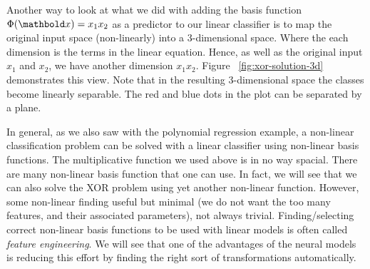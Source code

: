 Another way to look at what we did with adding the basis function
$\Phi(\vect{x}) = x_{1}x_{2}$ as a predictor to our linear classifier
is to map the original input space (non-linearly)
into a 3-dimensional space.
Where the each dimension is the terms in the linear equation.
Hence, as well as the original input $x_{1}$ and $x_{2}$,
we have another dimension $x_{1} x_{2}$.
Figure ~\ref{fig:xor-solution-3d} demonstrates this view.
Note that in the resulting 3-dimensional space
the classes become linearly separable.
The red and blue dots in the plot can be separated by a plane.
\begin{marginfigure}
  \caption{\label{fig:xor-solution-3d}%
    Another, three-dimensional, visualization of the solution
    in table~\ref{tbl:xor-solution}.
    Red points mark the positive class ($x_{1} \;\text{xor}\; x_{2} = 1$)
    and blue points mark the negative class  ($x_{1} \;\text{xor}\; x_{2} = 1$).
  }
\end{marginfigure}

In general, as we also saw with the polynomial regression example,
a non-linear classification problem can be solved
with a linear classifier using non-linear basis functions.
The multiplicative function we used above is in no way spacial.
There are many non-linear basis function that one can use.
In fact, we will see that we can also solve the XOR problem
using yet another non-linear function.
However, some non-linear finding useful but minimal
(we do not want the too many features, and their associated parameters),
not always trivial.
Finding/selecting correct non-linear basis functions to be used
with linear models is often called \emph{feature engineering}. 
We will see that one of the advantages of the neural models is
reducing this effort
by finding the right sort of transformations automatically.

